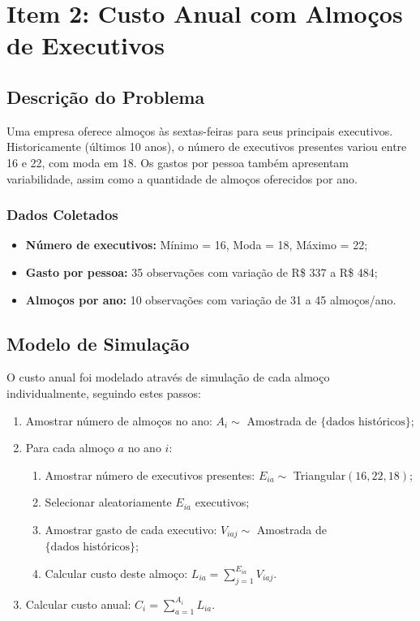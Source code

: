 \documentclass[12pt,a4paper]{article}
\begin{document}
\newpage

\section{Item 2: Custo Anual com Almoços de Executivos}

\subsection{Descrição do Problema}

Uma empresa oferece almoços às sextas-feiras para seus principais executivos. Historicamente (últimos 10 anos), o número de executivos presentes variou entre 16 e 22, com moda em 18. Os gastos por pessoa também apresentam variabilidade, assim como a quantidade de almoços oferecidos por ano.

\subsubsection{Dados Coletados}

\begin{itemize}
    \item \textbf{Número de executivos:} Mínimo = 16, Moda = 18, Máximo = 22;
    \item \textbf{Gasto por pessoa:} 35 observações com variação de R\$ 337 a R\$ 484;
    \item \textbf{Almoços por ano:} 10 observações com variação de 31 a 45 almoços/ano.
\end{itemize}

\subsection{Modelo de Simulação}

O custo anual foi modelado através de simulação de cada almoço individualmente, seguindo estes passos:

\begin{enumerate}
    \item Amostrar número de almoços no ano: $A_i \sim$ Amostrada de $\{\text{dados históricos}\}$;
    \item Para cada almoço $a$ no ano $i$:
    \begin{enumerate}
        \item Amostrar número de executivos presentes: $E_{ia} \sim$ Triangular$(16, 22, 18)$;
        \item Selecionar aleatoriamente $E_{ia}$ executivos;
        \item Amostrar gasto de cada executivo: $V_{iaj} \sim$ Amostrada de $\{\text{dados históricos}\}$;
        \item Calcular custo deste almoço: $L_{ia} = \sum_{j=1}^{E_{ia}} V_{iaj}$.
    \end{enumerate}
    \item Calcular custo anual: $C_i = \sum_{a=1}^{A_i} L_{ia}$.
\end{enumerate}
\end{document}
